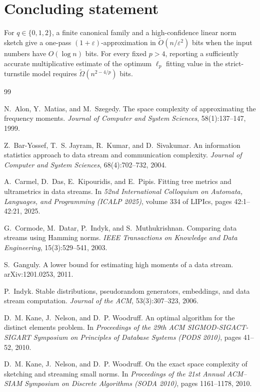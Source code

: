 \documentclass[11pt]{article}
\theoremstyle{definition}
\begin{document}
\section{Concluding statement}

For \(q\in\{0,1,2\}\), a finite canonical family and a high-confidence linear
norm sketch give a one-pass \((1+\varepsilon)\)-approximation in
\(\widetilde O(n/\varepsilon^2)\) bits when the input numbers have
\(O(\log n)\) bits.  For every fixed \(p>4\), reporting a sufficiently accurate
multiplicative estimate of the optimum \(\ell_p\) fitting value in the
strict-turnstile model requires
\(\widetilde\Omega(n^{2-4/p})\) bits.

\small
\begin{thebibliography}{99}

N.~Alon, Y.~Matias, and M.~Szegedy.
\newblock The space complexity of approximating the frequency moments.
\newblock \emph{Journal of Computer and System Sciences}, 58(1):137--147,
1999.

Z.~Bar-Yossef, T.~S. Jayram, R.~Kumar, and D.~Sivakumar.
\newblock An information statistics approach to data stream and communication
complexity.
\newblock \emph{Journal of Computer and System Sciences}, 68(4):702--732,
2004.

A.~Carmel, D.~Das, E.~Kipouridis, and E.~Pipis.
\newblock Fitting tree metrics and ultrametrics in data streams.
\newblock In \emph{52nd International Colloquium on Automata, Languages, and
Programming (ICALP 2025)}, volume 334 of LIPIcs, pages 42:1--42:21, 2025.

G.~Cormode, M.~Datar, P.~Indyk, and S.~Muthukrishnan.
\newblock Comparing data streams using Hamming norms.
\newblock \emph{IEEE Transactions on Knowledge and Data Engineering},
15(3):529--541, 2003.

S.~Ganguly.
\newblock A lower bound for estimating high moments of a data stream.
\newblock arXiv:1201.0253, 2011.

P.~Indyk.
\newblock Stable distributions, pseudorandom generators, embeddings, and data
stream computation.
\newblock \emph{Journal of the ACM}, 53(3):307--323, 2006.

D.~M. Kane, J.~Nelson, and D.~P. Woodruff.
\newblock An optimal algorithm for the distinct elements problem.
\newblock In \emph{Proceedings of the 29th ACM SIGMOD-SIGACT-SIGART Symposium
on Principles of Database Systems (PODS 2010)}, pages 41--52, 2010.

D.~M. Kane, J.~Nelson, and D.~P. Woodruff.
\newblock On the exact space complexity of sketching and streaming small
norms.
\newblock In \emph{Proceedings of the 21st Annual ACM--SIAM Symposium on
Discrete Algorithms (SODA 2010)}, pages 1161--1178, 2010.

\end{thebibliography}
\end{document}

